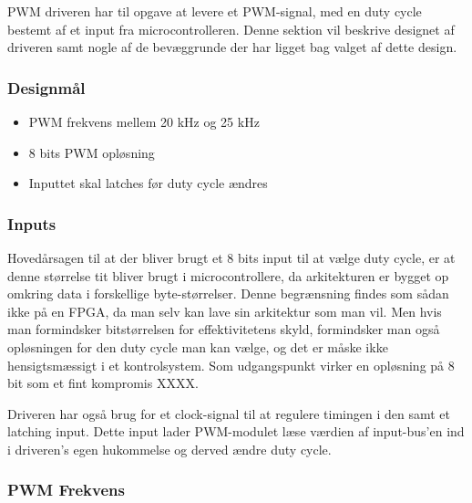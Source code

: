 PWM driveren har til opgave at levere et PWM-signal, med en duty cycle bestemt af et input fra microcontrolleren. Denne sektion vil beskrive designet af driveren samt nogle af de bevæggrunde der har ligget bag valget af dette design.

\subsubsection{Designmål}

\begin{itemize}

\item PWM frekvens mellem 20 kHz og 25 kHz
\item 8 bits PWM opløsning
\item Inputtet skal latches før duty cycle ændres

\end{itemize}

\subsubsection{Inputs}

Hovedårsagen til at der bliver brugt et 8 bits input til at vælge duty cycle, er at denne størrelse tit bliver brugt i microcontrollere, da arkitekturen er bygget op omkring data i forskellige byte-størrelser. Denne begrænsning findes som sådan ikke på en FPGA, da man selv kan lave sin arkitektur som man vil. Men hvis man formindsker bitstørrelsen for effektivitetens skyld, formindsker man også opløsningen for den duty cycle man kan vælge, og det er måske ikke hensigtsmæssigt i et kontrolsystem. Som udgangspunkt virker en opløsning på 8 bit som et fint kompromis XXXX.

Driveren har også brug for et clock-signal til at regulere timingen i den samt et latching input. Dette input lader PWM-modulet læse værdien af input-bus'en ind i driveren's egen hukommelse og derved ændre duty cycle.

\subsubsection{PWM Frekvens}


